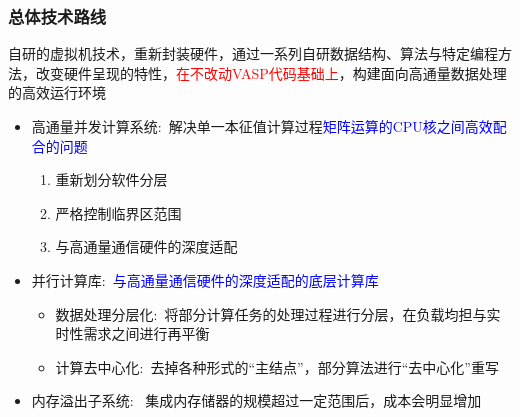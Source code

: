 \begin{frame}
	\frametitle{总体技术路线}
	自研的虚拟机技术，重新封装硬件，通过一系列自研数据结构、算法与特定编程方法，改变硬件呈现的特性，\textcolor{red}{在不改动\textrm{VASP}代码基础上}，构建面向高通量数据处理的高效运行环境
	\begin{itemize}
		\item 高通量并发计算系统:~解决单一本征值计算过程\textcolor{blue}{矩阵运算的\textrm{CPU}核之间高效配合的问题}
			\begin{enumerate}
\fontsize{7.2pt}{5.2pt}\selectfont
				\item 重新划分软件分层
				\item 严格控制临界区范围
				\item 与高通量通信硬件的深度适配
			\end{enumerate}
		\item 并行计算库:~\textcolor{blue}{与高通量通信硬件的深度适配的底层计算库}
			\begin{itemize}
\fontsize{7.2pt}{5.2pt}\selectfont
				\item 数据处理分层化:~将部分计算任务的处理过程进行分层，在负载均担与实时性需求之间进行再平衡
				\item 计算去中心化:~去掉各种形式的``主结点''，部分算法进行``去中心化''重写
			\end{itemize}
		\item 内存溢出子系统:~%
			集成内存储器的规模超过一定范围后，成本会明显增加\\
			{\fontsize{7.2pt}{5.2pt}}
	\end{itemize}
\end{frame}

